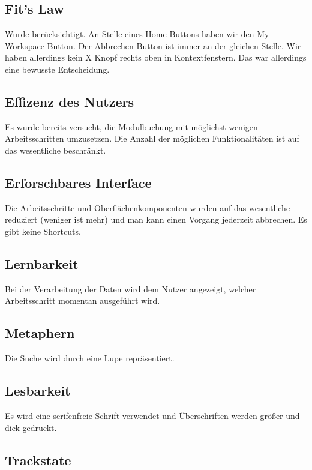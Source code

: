 \documentclass{article}
\begin{document}
\subsection{Fit's Law}

Wurde berücksichtigt. An Stelle eines Home Buttons haben wir den My Workspace-Button. Der Abbrechen-Button ist immer an der gleichen Stelle. Wir haben allerdings kein X Knopf rechts oben in Kontextfenstern. Das war allerdings eine bewusste Entscheidung.

\subsection{Effizenz des Nutzers}

Es wurde bereits versucht, die Modulbuchung mit möglichst wenigen Arbeitsschritten umzusetzen. Die Anzahl der möglichen Funktionalitäten ist auf das wesentliche beschränkt.

\subsection{Erforschbares Interface}

Die Arbeitsschritte und Oberflächenkomponenten wurden auf das wesentliche reduziert (weniger ist mehr) und man kann einen Vorgang jederzeit abbrechen. Es gibt keine Shortcuts.

\subsection{Lernbarkeit}

Bei der Verarbeitung der Daten wird dem Nutzer angezeigt, welcher Arbeitsschritt momentan ausgeführt wird.

\subsection{Metaphern}

Die Suche wird durch eine Lupe repräsentiert.

\subsection{Lesbarkeit}

Es wird eine serifenfreie Schrift verwendet und Überschriften werden größer und dick gedruckt.

\subsection{Trackstate}
\end{document}
